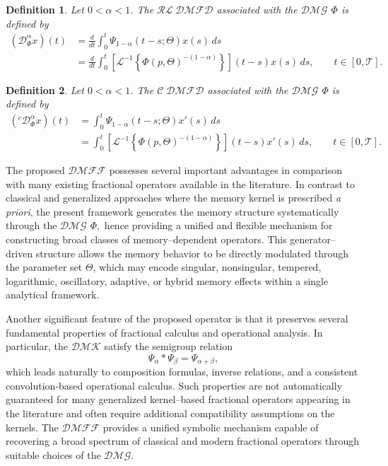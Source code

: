 \documentclass[11pt]{article}
\numberwithin{equation}{section}
\newtheorem{definition}{Definition}[section]
\begin{document}
\begin{definition}\label{26}
Let $0<\alpha<1$. The $\mathcal{RL\;DMFD}$ associated with the $\mathcal{DMG}$ $\Phi$ is defined by
\begin{equation}
\begin{aligned}
(\mathcal D_\Phi^\alpha x)(t)
&=
\frac{d}{dt}
\int_0^t
\Psi_{1-\alpha}(t-s;\Theta)x(s)\,ds \\
&=
\frac{d}{dt}
\int_0^t
\left[
\mathcal L^{-1}
\left\{
\Phi(p,\Theta)^{-(1-\alpha)}
\right\}
\right](t-s)
x(s)\,ds,
\qquad t\in[0,\mathcal{T}].
\end{aligned}
\end{equation}
\end{definition}

\begin{definition}\label{27}
Let $0<\alpha<1$. The $\mathcal{C\;DMFD}$ 
associated with the $\mathcal{DMG}$ $\Phi$ is defined by
\begin{equation}
\begin{aligned}
({}^c\mathcal D_\Phi^\alpha x)(t)
&=
\int_0^t
\Psi_{1-\alpha}(t-s;\Theta)x'(s)\,ds \\
&=
\int_0^t
\left[
\mathcal L^{-1}
\left\{
\Phi(p,\Theta)^{-(1-\alpha)}
\right\}
\right](t-s)
x'(s)\,ds,
\qquad t\in[0,\mathcal{T}].
\end{aligned}
\end{equation}
\end{definition}
\noindent The proposed $\mathcal{DMFF}$ possesses several important advantages in comparison with many existing fractional operators available in the literature. In contrast to classical and generalized approaches where the memory kernel is prescribed \emph{a priori}, the present framework generates the memory structure systematically through the $\mathcal{DMG}$ 
\(
\Phi,
\)
hence providing a unified and flexible mechanism for constructing broad classes of memory--dependent operators. This generator--driven structure allows the memory behavior to be directly modulated through the parameter set \(\Theta\), which may encode singular, nonsingular, tempered, logarithmic, oscillatory, adaptive, or hybrid memory effects within a single analytical framework.

Another significant feature of the proposed operator is that it preserves several fundamental properties of fractional calculus and operational analysis. In particular, the $\mathcal{DMK}$ satisfy the semigroup relation
\[
\Psi_{\alpha} * \Psi_{\beta}
=
\Psi_{\alpha+\beta},
\]
which leads naturally to composition formulas, inverse relations, and a consistent convolution-based operational calculus. Such properties are not automatically guaranteed for many generalized kernel--based fractional operators appearing in the literature and often require additional compatibility assumptions on the kernels.
The $\mathcal{DMFF}$ provides a unified symbolic mechanism capable of recovering a broad spectrum of classical and modern fractional operators through suitable choices of the $\mathcal{DMG}$. 
\end{document}
